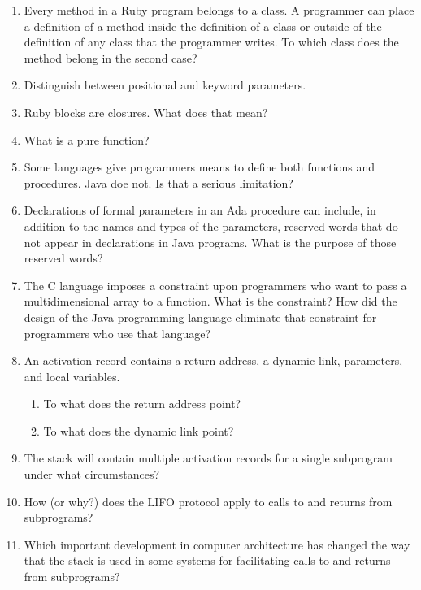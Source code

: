 \documentclass{article}
\begin{document}
\begin{enumerate}
  \item Every method in a Ruby program belongs to a class.
    A programmer can place a definition of a method inside
    the definition of a class or outside of the definition
    of any class that the programmer writes. To which class
    does the method belong in the second case?

  \item Distinguish between positional and keyword parameters.

  \item Ruby blocks are closures. What does that mean?

  \item What is a pure function?

  \item Some languages give programmers means to define
    both functions and procedures. Java doe not. Is that
    a serious limitation?

  \item Declarations of formal parameters in an Ada procedure
    can include, in addition to the names and types of the
    parameters, reserved words that do not appear in declarations
    in Java programs. 
    What is the purpose of those reserved words?
 
  \item The C language imposes a constraint upon programmers
    who want to pass a multidimensional array to a function.
    What is the constraint? How did the design of the Java
    programming language eliminate that constraint for 
    programmers who use that language?

  \item An activation record contains a return
    address, a dynamic link, parameters, and
    local variables.
  \begin{enumerate}
    \item To what does the return address point?
    \item To what does the dynamic link point?
    \end{enumerate}

  \item The stack will contain multiple activation
    records for a single subprogram under what
    circumstances?

  \item How (or why?) does the LIFO protocol apply to
    calls to and returns from subprograms?

  \item Which important development in computer architecture
    has changed the way that the stack is used in some
    systems for facilitating calls to and returns from
    subprograms?


\end{enumerate}
\end{document}
